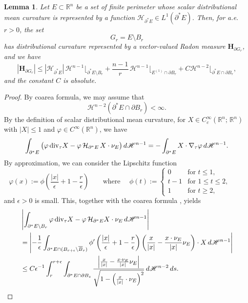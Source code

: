 \documentclass[reqno,11pt]{amsart}
\makeatletter
\def\ez{\epsilon}
\newtheorem{lem}[thm]{Lemma}%
\numberwithin{equation}{section}
\theoremstyle{remark}
\makeatother
\begin{document}
\begin{lem}\label{singular mean curvature}
Let $E\subset \mathbb R^n$ be a set of finite perimeter whose scalar
distributional mean curvature is represented by a function
$\mathcal H_{\partial^*E}\in L^1(\partial^* E)$. Then, for a.e. $r>0$, the set
$$G_r=E\setminus B_r$$
has distributional curvature represented by a vector-valued Radon measure $\mathbf H_{\partial G_r}$, and
we have
$$|\mathbf H_{\partial G_r}|\le |\mathcal H_{\partial^*E}|\, \mathscr H^{n-1}\lfloor_{\partial^*E\setminus B_r}+\frac{n-1}{r}\,\mathscr H^{n-1}\lfloor_{E^{(1)}\cap\partial B_r}+ C \mathscr H^{n-2}\lfloor_{\partial^*E\cap \partial B_{r}},$$
and the constant $C$ is absolute. 
\end{lem}
\begin{proof}
By coarea formula, we may assume that
$$\mathscr H^{n-2}(\partial^*E\cap \partial B_{r})<\infty. $$
By the definition of scalar distributional mean curvature, for $X\in C_c^\infty(\mathbb R^n;\, \mathbb R^n)$ with $|X|\le 1$ and $\varphi\in C^\infty(\mathbb R^n)$, we have
$$\int_{\partial^* E}\big( \varphi\, {\rm div}_\tau X -  \varphi\, \mathcal H_{\partial^* E}  \, X\cdot \nu_E\big)\, d\mathscr H^{n-1}=- \int_{\partial^* E} X \cdot \nabla_\tau \varphi  \,d\mathscr H^{n-1}.$$
By approximation, we can consider the Lipschitz function
$$
\varphi(x):=\phi\left(\frac{|x|}{\ez}+1-\frac{r}{\ez}\right)\qquad \text{where }\quad \phi(t):=\left\{
\begin{array}{ll}
0 &\text{for }t \leq 1,\\
t-1&\text{for }1 \leq t \leq 2,\\
1&\text{for }t \geq 2,
\end{array}
\right.
\qquad 
$$
and $\ez>0$ is small. This, together with the coarea formula \cite[Theorem 2, Section 3.4.3]{EG1992}, yields
\begin{align*}
&\left|\int_{\partial^* E\setminus B_{r}} \varphi\, {\rm div}_\tau X -  \varphi\, \mathcal H_{\partial^* E}   X\cdot \nu_E \, d\mathscr H^{n-1}\right|\\
&= \left| - \frac 1 \ez \int_{\partial^* E\cap (B_{r+\ez}\setminus \overline{B}_r)}   \phi'\left(\frac{|x|}{\ez}+1-\frac{r}{\ez}\right) \left(\frac x {|x|} -\frac{x\cdot \nu_E}{|x|} \nu_E\right)\cdot X \, d\mathscr H^{n-1}\right|\\
&\le  C  \ez^{-1}\int_{r}^{r+\ez}\int_{\partial^* E\cap \partial B_s}     \frac {\left|\frac x {|x|} -\frac{x\cdot \nu_E}{|x|} \nu_E\right|} {\sqrt{1-\left(\frac{x}{|x|}\cdot \nu_E\right)^2}} \, d\mathscr H^{n-2}\, ds. 
\end{align*}

\end{proof}
\end{document}

